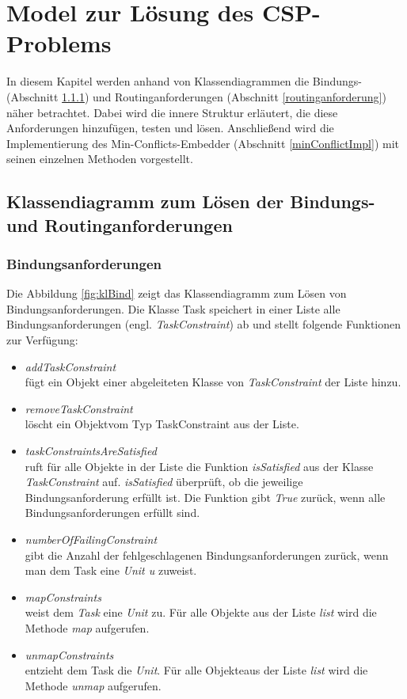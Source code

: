 \chapter{Model zur Lösung des CSP-Problems}\label{model}

In diesem Kapitel werden anhand von Klassendiagrammen die Bindungs- (Abschnitt \ref{bindunganforderung}) und Routinganforderungen (Abschnitt \ref{routinganforderung}) näher betrachtet. Dabei wird die innere Struktur erläutert, die diese Anforderungen hinzufügen, testen und lösen. Anschließend wird die Implementierung des Min-Conflicts-Embedder (Abschnitt \ref{minConflictImpl}) mit seinen einzelnen Methoden vorgestellt.

\section{Klassendiagramm zum Lösen der Bindungs- und Routinganforderungen}

\subsection{Bindungsanforderungen}\label{bindunganforderung}

Die Abbildung \ref{fig:klBind} zeigt das Klassendiagramm zum Lösen von Bindungsanforderungen. Die Klasse Task speichert in einer Liste alle Bindungsanforderungen (engl. \textit{TaskConstraint}) ab und stellt folgende Funktionen zur Verfügung:

\begin{itemize}
\item \textit{addTaskConstraint}\\
fügt ein Objekt einer abgeleiteten Klasse von \textit{TaskConstraint} der Liste hinzu. 
\item \textit{removeTaskConstraint}\\
löscht ein Objektvom Typ TaskConstraint aus der Liste.
\item \textit{taskConstraintsAreSatisfied}\\
ruft für alle Objekte in der Liste die Funktion \textit{isSatisfied} aus der Klasse \textit{TaskConstraint} auf. \textit{isSatisfied} überprüft, ob die jeweilige Bindungsanforderung erfüllt ist. Die Funktion gibt \textit{True} zurück, wenn alle Bindungsanforderungen erfüllt sind.%
\item \textit{numberOfFailingConstraint}\\
gibt die Anzahl der fehlgeschlagenen Bindungsanforderungen zurück, wenn man dem Task eine \textit{Unit u} zuweist. 
\item \textit{mapConstraints}\\
weist dem \textit{Task} eine \textit{Unit} zu. Für alle Objekte aus der Liste \textit{list} wird die Methode \textit{map} aufgerufen.
\item \textit{unmapConstraints}\\
entzieht dem Task die \textit{Unit}. Für alle Objekteaus der Liste \textit{list} wird die Methode \textit{unmap} aufgerufen.
\end{itemize}

